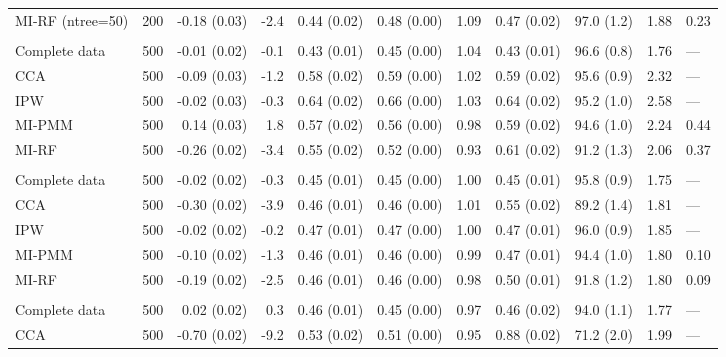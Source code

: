 \documentclass[11pt,a4paper]{article}
\begin{document}
\begin{landscape}
\begin{longtable}{l|rrrrrrrrrl}
\midrule\addlinespace[2.5pt]
\multicolumn{11}{l}{Wasting — MAR 30\% (ntree=50)} \\[2.5pt] 
\midrule\addlinespace[2.5pt]
MI-RF (ntree=50) & 200 & -0.18 (0.03) & -2.4 & 0.44 (0.02) & 0.48 (0.00) & 1.09 & 0.47 (0.02) & 97.0 (1.2) & 1.88 & 0.23 \\ 
\midrule\addlinespace[2.5pt]
\multicolumn{11}{l}{Wasting — MAR 50\%} \\[2.5pt] 
\midrule\addlinespace[2.5pt]
Complete data & 500 & -0.01 (0.02) & -0.1 & 0.43 (0.01) & 0.45 (0.00) & 1.04 & 0.43 (0.01) & 96.6 (0.8) & 1.76 & — \\ 
CCA & 500 & -0.09 (0.03) & -1.2 & 0.58 (0.02) & 0.59 (0.00) & 1.02 & 0.59 (0.02) & 95.6 (0.9) & 2.32 & — \\ 
IPW & 500 & -0.02 (0.03) & -0.3 & 0.64 (0.02) & 0.66 (0.00) & 1.03 & 0.64 (0.02) & 95.2 (1.0) & 2.58 & — \\ 
MI-PMM & 500 & 0.14 (0.03) & 1.8 & 0.57 (0.02) & 0.56 (0.00) & 0.98 & 0.59 (0.02) & 94.6 (1.0) & 2.24 & 0.44 \\ 
MI-RF & 500 & -0.26 (0.02) & -3.4 & 0.55 (0.02) & 0.52 (0.00) & 0.93 & 0.61 (0.02) & 91.2 (1.3) & 2.06 & 0.37 \\ 
\midrule\addlinespace[2.5pt]
\multicolumn{11}{l}{Wasting — MAR-strong 10\%} \\[2.5pt] 
\midrule\addlinespace[2.5pt]
Complete data & 500 & -0.02 (0.02) & -0.3 & 0.45 (0.01) & 0.45 (0.00) & 1.00 & 0.45 (0.01) & 95.8 (0.9) & 1.75 & — \\ 
CCA & 500 & -0.30 (0.02) & -3.9 & 0.46 (0.01) & 0.46 (0.00) & 1.01 & 0.55 (0.02) & 89.2 (1.4) & 1.81 & — \\ 
IPW & 500 & -0.02 (0.02) & -0.2 & 0.47 (0.01) & 0.47 (0.00) & 1.00 & 0.47 (0.01) & 96.0 (0.9) & 1.85 & — \\ 
MI-PMM & 500 & -0.10 (0.02) & -1.3 & 0.46 (0.01) & 0.46 (0.00) & 0.99 & 0.47 (0.01) & 94.4 (1.0) & 1.80 & 0.10 \\ 
MI-RF & 500 & -0.19 (0.02) & -2.5 & 0.46 (0.01) & 0.46 (0.00) & 0.98 & 0.50 (0.01) & 91.8 (1.2) & 1.80 & 0.09 \\ 
\midrule\addlinespace[2.5pt]
\multicolumn{11}{l}{Wasting — MAR-strong 30\%} \\[2.5pt] 
\midrule\addlinespace[2.5pt]
Complete data & 500 & 0.02 (0.02) & 0.3 & 0.46 (0.01) & 0.45 (0.00) & 0.97 & 0.46 (0.02) & 94.0 (1.1) & 1.77 & — \\ 
CCA & 500 & -0.70 (0.02) & -9.2 & 0.53 (0.02) & 0.51 (0.00) & 0.95 & 0.88 (0.02) & 71.2 (2.0) & 1.99 & — \\ 

\end{longtable}
\end{landscape}
\end{document}
